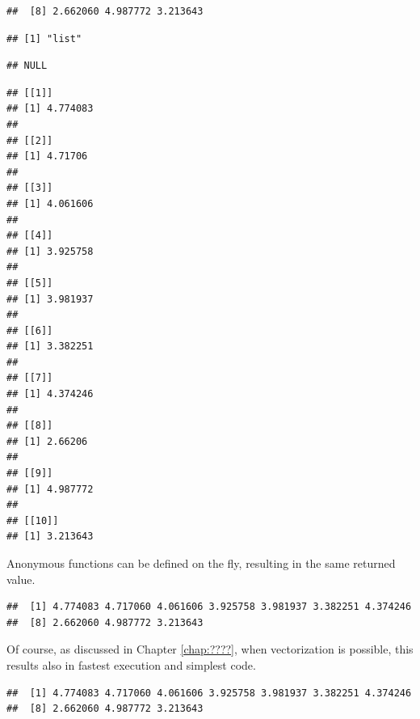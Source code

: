 \documentclass[krantz2,ChapterTOCs]{krantz}\usepackage{knitr}
\begin{document}
\begin{knitrout}
\begin{kframe}
\begin{verbatim}
##  [8] 2.662060 4.987772 3.213643
\end{verbatim}
\begin{alltt}
 \hlkwb{<-} \hlstd{(}     \hlstd{=} \hlstd{,}  \hlstd{=} \hlstd{)}
\end{alltt}
\begin{verbatim}
## [1] "list"
\end{verbatim}
\begin{alltt}
\end{alltt}
\begin{verbatim}
## NULL
\end{verbatim}
\begin{alltt}
\end{alltt}
\begin{verbatim}
## [[1]]
## [1] 4.774083
## 
## [[2]]
## [1] 4.71706
## 
## [[3]]
## [1] 4.061606
## 
## [[4]]
## [1] 3.925758
## 
## [[5]]
## [1] 3.981937
## 
## [[6]]
## [1] 3.382251
## 
## [[7]]
## [1] 4.374246
## 
## [[8]]
## [1] 2.66206
## 
## [[9]]
## [1] 4.987772
## 
## [[10]]
## [1] 3.213643
\end{verbatim}
\end{kframe}
\end{knitrout}

Anonymous functions can be defined on the fly, resulting in the same returned value.
\begin{knitrout}\footnotesize
{}\color{fgcolor}\begin{kframe}
\begin{alltt}
\hlstd{(}   \hlstd{=} \hlstd{(}\hlstd{,} \hlstd{) \{} \hlopt{+}   \hlstd{=} \hlstd{)}
\end{alltt}
\begin{verbatim}
##  [1] 4.774083 4.717060 4.061606 3.925758 3.981937 3.382251 4.374246
##  [8] 2.662060 4.987772 3.213643
\end{verbatim}
\end{kframe}
\end{knitrout}

Of course, as discussed in Chapter \ref{chap:????}, when vectorization is possible, this results also in fastest execution and simplest code.
\begin{knitrout}\footnotesize
{}\color{fgcolor}\begin{kframe}
\begin{alltt}
 \hlopt{+} 
\end{alltt}
\begin{verbatim}
##  [1] 4.774083 4.717060 4.061606 3.925758 3.981937 3.382251 4.374246
##  [8] 2.662060 4.987772 3.213643
\end{verbatim}
\end{kframe}
\end{knitrout}
\end{document}
